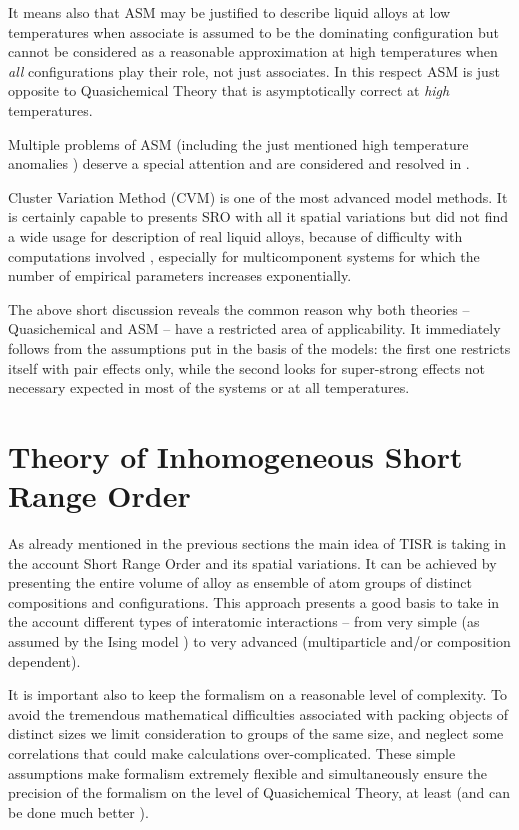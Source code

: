\documentclass[12pt,abstract]{scrartcl}
\begin{document}
It means also that ASM may be justified to describe liquid alloys at low temperatures when associate is assumed to be the dominating configuration but cannot be considered as a reasonable approximation at high temperatures when \textit{all} configurations play their role, not just associates. In this respect ASM is just opposite to Quasichemical Theory that is asymptotically correct at \textit{high} temperatures.

 Multiple problems of ASM   (including the just mentioned high temperature anomalies \cite{Pelton2007}) deserve a special attention and are considered and resolved in \cite{TISR_p3}.

Cluster Variation Method (CVM) \cite{Kikuchi1977}  is one of the most advanced model methods. It is certainly capable to presents SRO with all it spatial variations but did not find a wide usage for description of real liquid alloys,  because of difficulty with computations involved \cite{Ansara2000}, especially for multicomponent systems for which the number of empirical parameters increases exponentially.

The above short discussion reveals the common reason why both theories -- Quasichemical  and ASM -- have  a restricted area of applicability. It immediately follows from the assumptions put in the basis of the models: the first one restricts itself with  pair effects only, while the second looks for super-strong effects not necessary  expected in most of the systems or at all temperatures.  


\section{Theory of Inhomogeneous Short Range Order}


As already mentioned in the previous sections the main idea of TISR is taking in the account Short Range Order and  its spatial variations. It can be achieved by presenting the entire volume of alloy as ensemble  of atom groups of distinct compositions and configurations. 
This approach presents a good basis to take in the account  different types of  interatomic interactions -- from very simple (as assumed by the Ising model \cite{Domb1974}) to very advanced (multiparticle and/or composition dependent).

It is  important also to keep the  formalism  on a reasonable level of complexity.  
To avoid the tremendous mathematical difficulties associated with packing  objects of distinct sizes  we  limit consideration to groups of the same size, and neglect some correlations that could make calculations  over-complicated. 
These simple assumptions make formalism extremely flexible  and simultaneously ensure the precision of the formalism on the level of Quasichemical Theory, at least (and can be done much better \cite{TISR_p4}).
\end{document}
